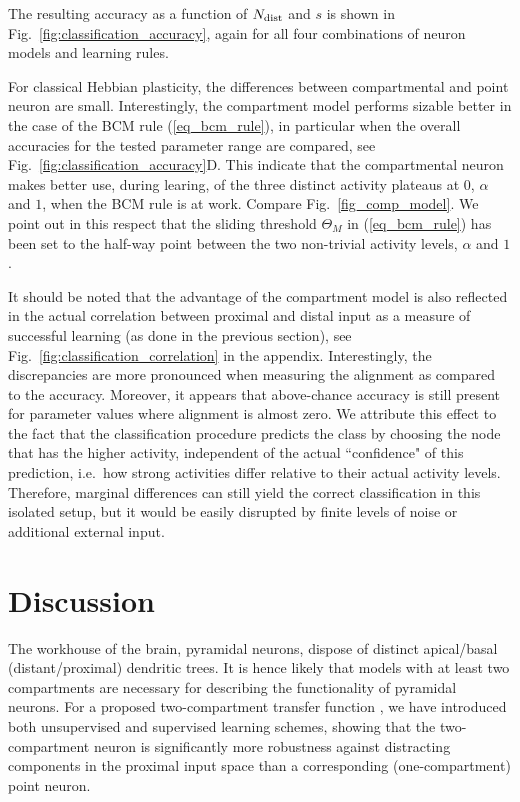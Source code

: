 \documentclass[utf8]{frontiersSCNS} %
\begin{document}
The resulting accuracy as a function of $N_{\rm dist}$ and $s$
is shown in Fig.~\ref{fig:classification_accuracy}, again for all
four combinations of neuron models and learning rules.

For classical Hebbian plasticity, the differences between
compartmental and point neuron are small. Interestingly,
the compartment model performs sizable better in
the case of the BCM rule (\ref{eq_bcm_rule}), in 
particular when the overall accuracies for the 
tested parameter range are compared, see 
Fig.~\ref{fig:classification_accuracy}D.
This indicate that the compartmental neuron
makes better use, during learing, of the
three distinct activity plateaus at
$0$, $\alpha$ and $1$, when the BCM
rule is at work. Compare
Fig.~\ref{fig_comp_model}. We point
out in this respect that the sliding 
threshold $\Theta_M$ in (\ref{eq_bcm_rule}) 
has been set to the half-way point between
the two non-trivial activity levels,
$\alpha$ and $1$. 

It should be noted that the advantage of the 
compartment model is also reflected in the actual
correlation between proximal and distal input 
as a measure of successful learning (as done 
in the previous section), see 
Fig.~\ref{fig:classification_correlation} in 
the appendix. Interestingly,
the discrepancies are more pronounced when measuring
the alignment as compared to the accuracy. Moreover,
it appears that above-chance accuracy is still present
for parameter values where alignment is almost zero.
We attribute this effect to the fact that the 
classification procedure predicts the class by
choosing the node that has the higher activity, independent
of the actual ``confidence" of this prediction, i.e.\, how strong
activities differ relative to their actual activity levels.
Therefore, marginal differences can still
yield the correct classification in this isolated setup, 
but it would be easily disrupted by finite levels of noise or
additional external input.

\section{Discussion}


The workhouse of the brain, pyramidal neurons,
dispose of distinct apical/basal (distant/proximal)
dendritic trees. It is hence likely that models
with at least two compartments are necessary for
describing the functionality of pyramidal neurons.
For a proposed two-compartment transfer function
\citep{Shai_2015},
we have introduced both unsupervised and supervised 
learning schemes, showing that the two-compartment
neuron is significantly more robustness against 
distracting components in the proximal input 
space than a corresponding (one-compartment) point
neuron.
\end{document}
